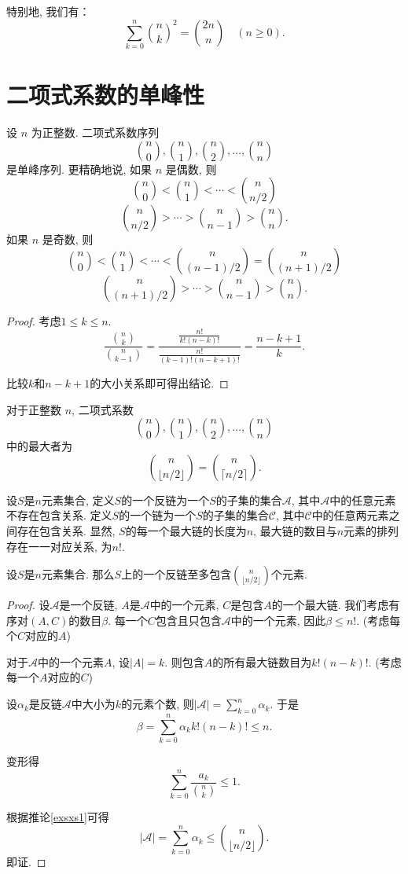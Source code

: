 特别地, 我们有：
\[\sum_{k=0}^{n} \binom{n}{k}^2 = \binom{2n}{n} \quad (n \geqslant 0).  \]

\section{二项式系数的单峰性}
\begin{theorem}
    设 $n$ 为正整数.   二项式系数序列
    \[
        \binom{n}{0},  \binom{n}{1},  \binom{n}{2},  \ldots,  \binom{n}{n}
    \]
    是单峰序列.  更精确地说, 如果 $n$ 是偶数, 则
    \[
        \binom{n}{0} < \binom{n}{1} < \cdots < \binom{n}{n/2} \]\[
        \binom{n}{n/2} > \cdots > \binom{n}{n-1} > \binom{n}{n}.
    \]
    如果 $n$ 是奇数, 则
    \[
        \binom{n}{0} < \binom{n}{1} < \cdots < \binom{n}{(n-1)/2} = \binom{n}{(n+1)/2} \]\[
        \binom{n}{(n+1)/2} > \cdots > \binom{n}{n-1} > \binom{n}{n}.
    \]
\end{theorem}
\begin{proof}
    考虑\(1\leq k\leq n\).
    \[\frac{\binom{n}{k}}{\binom{n}{k-1}} = \frac{\frac{n!}{k!(n-k)!}}{\frac{n!}{(k-1)!(n-k+1)!}} = \frac{n-k+1}{k}.  \]

    比较\(k\)和\(n-k+1\)的大小关系即可得出结论.
\end{proof}
\begin{corollary}\label{exsxs1}
    对于正整数 $n$, 二项式系数
    \[
        \binom{n}{0},  \binom{n}{1},  \binom{n}{2},  \ldots,  \binom{n}{n}
    \]
    中的最大者为
    \[
        \binom{n}{\lfloor n/2 \rfloor} = \binom{n}{\lceil n/2 \rceil}.
    \]
\end{corollary}

设$S$是$n$元素集合, 定义$S$的一个反链为一个$S$的子集的集合$\mathcal{A}$, 其中$\mathcal{A}$中的任意元素不存在包含关系.   定义$S$的一个链为一个$S$的子集的集合$\mathcal{C}$, 其中$\mathcal{C}$中的任意两元素之间存在包含关系.   显然, $S$的每一个最大链的长度为$n$, 最大链的数目与$n$元素的排列存在一一对应关系, 为$n!$.

\begin{theorem}[Sperner定理]
    设$S$是$n$元素集合.   那么$S$上的一个反链至多包含$\binom{n}{\lfloor n/2 \rfloor}$个元素.
\end{theorem}
\begin{proof}
    设$\mathcal{A}$是一个反链, $A$是$\mathcal{A}$中的一个元素, $C$是包含$A$的一个最大链. 我们考虑有序对$(A,C)$的数目$\beta $. 每一个$C$包含且只包含$\mathcal{A}$中的一个元素, 因此$\beta \leq n!$. (考虑每个$C$对应的$A$)

    对于$\mathcal{A}$中的一个元素$A$, 设$|A|=k$. 则包含$A$的所有最大链数目为$k!(n-k)!$. (考虑每一个$A$对应的$C$)

    设$\alpha_k$是反链$\mathcal{A}$中大小为$k$的元素个数, 则$|\mathcal{A}|=\sum_{k=0}^{n}\alpha_k$. 于是
    $$\beta=\sum_{k=0}^{n}\alpha_k k!(n-k)!\leq n.$$

    变形得
    $$\sum_{k=0}^{n} \frac{a_k}{\binom{n}{k}} \leq 1.$$

    根据推论\ref{exsxs1}可得
    $$|\mathcal{A}|=\sum_{k=0}^{n}\alpha_k \leq\binom{n}{\lfloor n/2 \rfloor}.$$
    即证.
\end{proof}


